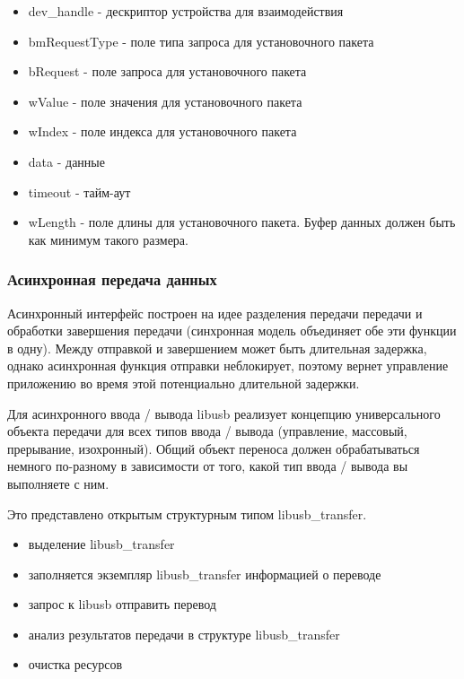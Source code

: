 \documentclass[14pt,a4paper]{article}
\begin{document}
\begin{itemize}
    \item dev\_handle - дескриптор устройства для взаимодействия
    \item bmRequestType - поле типа запроса для установочного пакета
    \item bRequest - поле запроса для установочного пакета 
    \item wValue - поле значения для установочного пакета
    \item wIndex - поле индекса для установочного пакета
    \item data - данные
    \item timeout - тайм-аут
    \item wLength - поле длины для установочного пакета. Буфер данных должен быть как минимум такого размера.
\end{itemize}

\subsubsection{Асинхронная передача данных}
Асинхронный интерфейс построен на идее разделения передачи передачи и обработки завершения передачи (синхронная модель объединяет обе эти функции в одну). Между отправкой и завершением может быть длительная задержка, однако асинхронная функция отправки неблокирует, поэтому вернет управление приложению во время этой потенциально длительной задержки.\\

\par Для асинхронного ввода / вывода libusb реализует концепцию универсального объекта передачи для всех типов ввода / вывода (управление, массовый, прерывание, изохронный). Общий объект переноса должен обрабатываться немного по-разному в зависимости от того, какой тип ввода / вывода вы выполняете с ним.\\

\par Это представлено открытым структурным типом libusb\_transfer.\\

\begin{itemize}
    \item выделение libusb\_transfer
    \item заполняется экземпляр libusb\_transfer информацией о переводе
    \item запрос к libusb отправить перевод
    \item анализ результатов передачи в структуре libusb\_transfer
    \item очистка ресурсов
\end{itemize}
\end{document}
